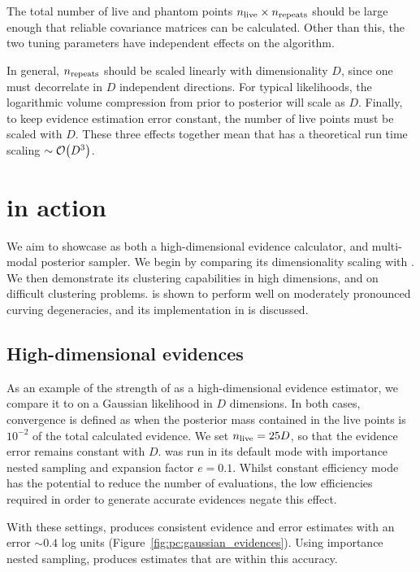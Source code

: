 The total number of live and phantom points \({n_{\mathrm{live}}\times n_{\mathrm{repeats}}}\) should be large enough that reliable covariance matrices can be calculated. Other than this, the two tuning parameters have independent effects on the algorithm. 

In general, \(n_{\mathrm{repeats}}\) should be scaled linearly with dimensionality \(D\), since one must decorrelate in \(D\) independent directions. For typical likelihoods, the logarithmic volume compression from prior to posterior will scale as \(D\). Finally, to keep evidence estimation error constant, the number of live points must be scaled with \(D\). These three effects together mean that \PolyChord{} has a theoretical run time scaling \({\sim\mathcal{O}{\left(D^3\right)}}\).

\section{\PolyChord{} in action}
\label{sec:pc:polychord_in_action}
We aim to showcase \PolyChord{} as both a high-dimensional evidence calculator, and multi-modal posterior sampler. We begin by comparing its dimensionality scaling with \MultiNest{}. We then demonstrate its clustering capabilities in high dimensions, and on difficult clustering problems. \PolyChord{} is shown to perform well on moderately pronounced curving degeneracies, and its implementation in \CosmoMC{} is discussed.

\subsection{High-dimensional evidences}
\label{sec:pc:hi_ev}

As an example of the strength of \PolyChord{} as a high-dimensional evidence estimator, we compare it to \MultiNest{} on a Gaussian likelihood in \(D\) dimensions.  In both cases, convergence is defined as when the posterior mass contained in the live points is \(10^{-2}\) of the total calculated evidence.  We set \(n_{\mathrm{live}}=25D\), so that the evidence error remains constant with \(D\). \MultiNest{} was run in its default mode with importance nested sampling and expansion factor \(e=0.1\).  Whilst constant efficiency mode has the potential to reduce the number of \MultiNest{} evaluations, the low efficiencies required in order to generate accurate evidences negate this effect.                                       


With these settings, \PolyChord{} produces consistent evidence and error estimates with an error \(\sim0.4\) log units (Figure~\ref{fig:pc:gaussian_evidences}). Using importance nested sampling, \MultiNest{} produces estimates that are within this accuracy.

